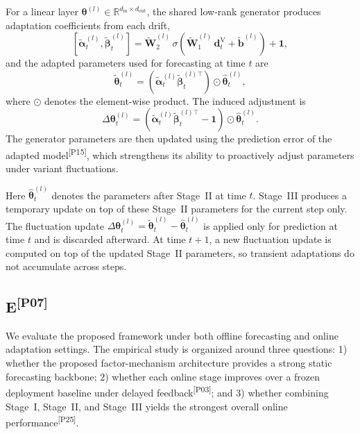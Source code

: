 ﻿\documentclass[journal]{IEEEtran}
\DeclareRobustCommand{\auditbad}[2]{{\color{auditred}#1}{\color{auditred}\textsuperscript{[#2]}}}
\begin{document}
For a linear layer $\boldsymbol{\theta}^{(l)}\in\mathbb{R}^{d_{\mathrm{in}}\times d_{\mathrm{out}}}$, the shared low-rank generator produces adaptation coefficients from each drift,
\begin{equation}
\left[\tilde{\boldsymbol{\alpha}}^{(l)}_t,\tilde{\boldsymbol{\beta}}^{(l)}_t\right]
=\tilde{\mathbf{W}}^{(l)}_2\,\sigma\!\left(\tilde{\mathbf{W}}^{(l)}_1\,\mathbf{d}^{\mathrm{V}}_t+\tilde{\mathbf{b}}^{(l)}\right)+\mathbf{1},
\end{equation}
and the adapted parameters used for forecasting at time $t$ are
\begin{equation}
\tilde{{\boldsymbol{\theta}}}^{(l)}_t=\left(\tilde{\boldsymbol{\alpha}}^{(l)}_t\tilde{\boldsymbol{\beta}}^{(l)\top}_t\right)\odot \widehat{\boldsymbol{\theta}}^{(l)}_t,
\end{equation}
where $\odot$ denotes the element-wise product. The induced adjustment is
\begin{equation}
\Delta\boldsymbol{\theta}^{(l)}_t=\left(\tilde{\boldsymbol{\alpha}}^{(l)}_t\tilde{\boldsymbol{\beta}}^{(l)\top}_t-\mathbf{1}\right)\odot \widehat{\boldsymbol{\theta}}^{(l)}_t.
\end{equation}
The \auditbad{generator parameters are then updated using the prediction error of the adapted model}{P15}, which strengthens its ability to proactively adjust parameters under variant fluctuations. 

Here $\widehat{\boldsymbol{\theta}}^{(l)}_t$ denotes the parameters after Stage~II at time $t$. Stage~III produces a temporary update on top of these Stage~II parameters for the current step only. The fluctuation update $\Delta\boldsymbol{\theta}^{(l)}_t=\tilde{\boldsymbol{\theta}}^{(l)}_t-\widehat{\boldsymbol{\theta}}^{(l)}_t$ is applied only for prediction at time $t$ and is discarded afterward. At time $t+1$, a new fluctuation update is computed on top of the updated Stage~II parameters, so transient adaptations do not accumulate across steps.

\subsection{\auditbad{E}{P07}}
We evaluate the proposed framework under both offline forecasting and online adaptation settings. The empirical study is organized around three questions: 1) whether the proposed factor-mechanism architecture provides a strong static forecasting backbone; 2) whether each online stage improves over a frozen deployment baseline under \auditbad{delayed feedback}{P03}; and 3) whether combining Stage~I, Stage~II, and Stage~III yields the \auditbad{strongest overall online performance}{P25}.
\end{document}
